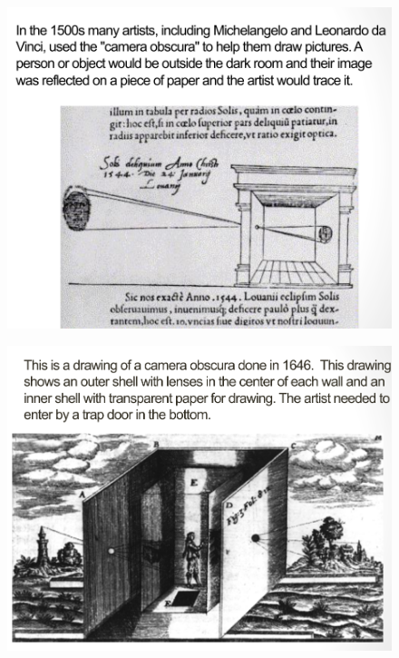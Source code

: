 \documentclass{beamer}
\begin{document}
\begin{frame}
	\begin{figure}
		\centering
		\includegraphics[scale=0.4]{67.jpg}
	\end{figure}
\end{frame}

\begin{frame}
	\begin{figure}
		\centering
		\includegraphics[scale=0.4]{68.jpg}
	\end{figure}
\end{frame}
\end{document}
